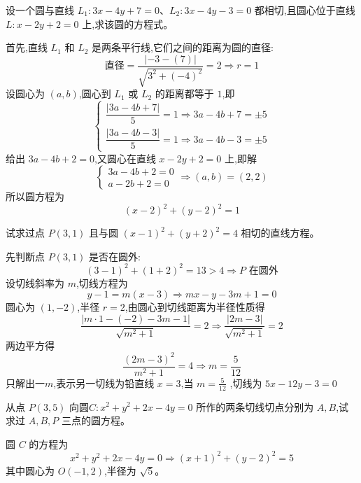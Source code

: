 \begin{questions}
    \question 设一个圆与直线 \(L_1: 3x - 4y + 7 = 0\)、\(L_2: 3x - 4y - 3 = 0\) 都相切,且圆心位于直线 \(L: x - 2y + 2 = 0\) 上,求该圆的方程式。  
    \begin{solution}
        首先,直线 \(L_1\) 和 \(L_2\) 是两条平行线,它们之间的距离为圆的直径:
        \[
        \text{直径} = \frac{|-3 - (7)|}{\sqrt{3^2 + (-4)^2}} = 2 \Rightarrow r = 1
        \]
        设圆心为 \((a, b)\),圆心到 \(L_1\) 或 \(L_2\) 的距离都等于 \(1\),即\[
        \begin{cases}
        \dfrac{|3a - 4b + 7|}{5} = 1 \Rightarrow  3a - 4b + 7 = \pm 5 \\
        \dfrac{|3a - 4b - 3|}{5} = 1 \Rightarrow  3a - 4b -3 = \pm 5 
        \end{cases}
        \]
        给出 $3a - 4b +2=0$,又圆心在直线 \(x - 2y + 2 = 0\) 上,即解\[
        \begin{cases}
        3a - 4b + 2 = 0 \\
        a - 2b + 2 = 0 
        \end{cases} \Rightarrow (a,b)=(2,2)
        \]     
        所以圆方程为
        \[
        (x - 2)^2 + (y - 2)^2 = 1
        \]
        \end{solution}

    \question 试求过点 \(P(3, 1)\) 且与圆 \((x - 1)^2 + (y + 2)^2 = 4\) 相切的直线方程。  
        \begin{solution}
        先判断点 \(P(3, 1)\) 是否在圆外:
        \[
        (3 - 1)^2 + (1 + 2)^2 = 13 > 4
        \Rightarrow P \text{ 在圆外}
        \]
        设切线斜率为 \(m\),切线方程为
        \[
        y - 1 = m(x - 3) \Rightarrow mx - y - 3m + 1 = 0
        \]
        圆心为 \((1, -2)\),半径 \(r = 2\),由圆心到切线距离为半径性质得
        \[
        \frac{|m \cdot 1 - (-2) - 3m - 1|}{\sqrt{m^2 + 1}} = 2
        \Rightarrow \frac{|2m - 3|}{\sqrt{m^2 + 1}} = 2
        \]
        两边平方得
        \[
        \frac{(2m - 3)^2}{m^2 + 1} = 4
        \Rightarrow m=\frac{5}{12}
        \]
        只解出一$m$,表示另一切线为铅直线 $x=3$,当 $m=\frac{5}{12}$ ,切线为 $5x-12y-3=0$
    \end{solution}
        
    \question 从点 \(P(3,5)\) 向圆\(C: x^2 + y^2 + 2x - 4y = 0\) 所作的两条切线切点分别为 \(A,B\),试求过 \(A,B,P\) 三点的圆方程。  
    \begin{solution}
        圆 \(C\) 的方程为
        \[
        x^2 + y^2 + 2x - 4y = 0 \Rightarrow (x+1)^2 + (y-2)^2 = 5
        \]
        其中圆心为 \(O(-1, 2)\),半径为 \(\sqrt{5}\)。
        

\end{solution}
\end{questions}
